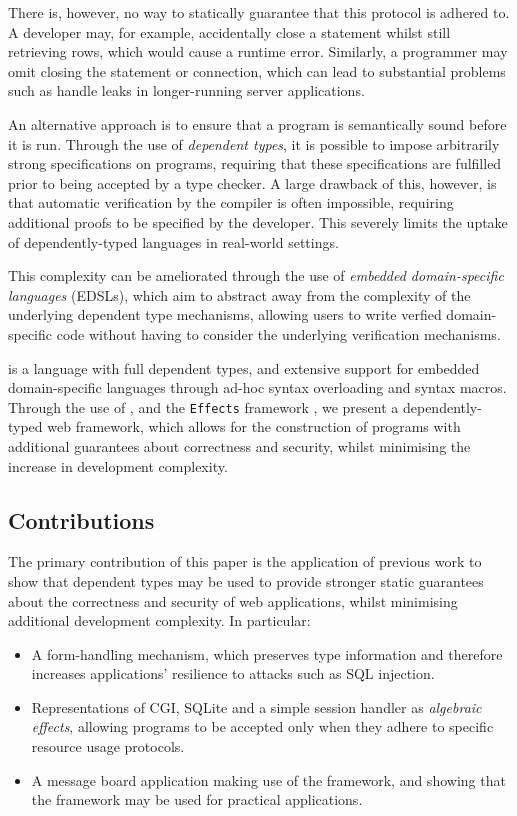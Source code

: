\documentclass[preprint]{sigplanconf}
\begin{document}
There is, however, no way to statically guarantee that this protocol is adhered to. A developer may, for example, accidentally close a statement whilst still retrieving rows, which would cause a runtime error. Similarly, a programmer may omit closing the statement or connection, which can lead to substantial problems such as handle leaks in longer-running server applications.

An alternative approach is to ensure that a program is semantically sound before it is run. Through the use of \textit{dependent types}, it is possible to impose arbitrarily strong specifications on programs, requiring that these specifications are fulfilled prior to being accepted by a type checker. A large drawback of this, however, is that automatic verification by the compiler is often impossible, requiring additional proofs to be specified by the developer. This severely limits the uptake of dependently-typed languages in real-world settings.

This complexity can be ameliorated through the use of \textit{embedded domain-specific languages} (EDSLs), which aim to abstract away from the complexity of the underlying dependent type mechanisms, allowing users to write verfied domain-specific code without having to consider the underlying verification mechanisms.   %

\idris{} \cite{brady2011idris} is a language with full dependent types, and extensive support for embedded domain-specific languages through ad-hoc syntax overloading and syntax macros. Through the use of \idris{}, and the \texttt{Effects} framework \cite{brady:effects}, we present a dependently-typed web framework, which allows for the construction of programs with additional guarantees about correctness and security, whilst minimising the increase in development complexity. 

\subsection{Contributions}
The primary contribution of this paper is the application of previous work to show that dependent types may be used to provide stronger static guarantees about the correctness and security of web applications, whilst minimising additional development complexity. In particular:

\begin{itemize}
\item A form-handling mechanism, which preserves type information and therefore increases applications' resilience to attacks such as SQL injection.
\item Representations of CGI, SQLite and a simple session handler as \textit{algebraic effects}, allowing programs to be accepted only when they adhere to specific resource usage protocols.
\item A message board application making use of the framework, and showing that the framework may be used for practical applications.
\end{itemize}
\end{document}
